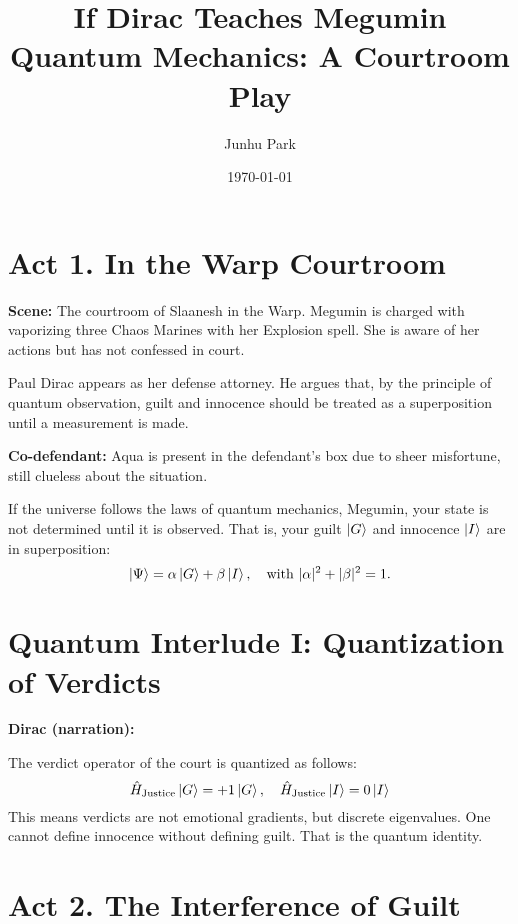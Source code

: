 \documentclass[12pt]{article}
\title{\textbf{If Dirac Teaches Megumin Quantum Mechanics: A Courtroom Play}}
\author{Junhu Park}
\date{\today}
\begin{document}
\maketitle

\section*{Act 1. In the Warp Courtroom}

\textbf{Scene:} The courtroom of Slaanesh in the Warp\cite{SlaaneshWikipedia}.  
Megumin\cite{MeguminWikipedia} is charged with vaporizing three Chaos Marines with her Explosion spell.  
She is aware of her actions but has not confessed in court.

Paul Dirac\cite{DiracWikipedia} appears as her defense attorney.  
He argues that, by the principle of quantum observation\cite{vonNeumann1955}, guilt and innocence should be treated as a superposition until a measurement is made.

\textbf{Co-defendant:}  
Aqua\cite{AquaWikipedia} is present in the defendant's box due to sheer misfortune, still clueless about the situation.

\begin{tcolorbox}[title=Dirac:]
If the universe follows the laws of quantum mechanics\cite{Dirac1930,Griffiths2018}, Megumin, your state is not determined until it is observed. That is, your guilt $\ket{G}$ and innocence $\ket{I}$ are in superposition:
\[
\ket{\Psi} = \alpha \ket{G} + \beta \ket{I}, \quad \text{with } |\alpha|^2 + |\beta|^2 = 1.
\]
\end{tcolorbox}

\section*{Quantum Interlude I: Quantization of Verdicts}

\textbf{Dirac (narration):}

The verdict operator of the court is quantized\cite{NielsenChuang2010} as follows:
\[
\hat{H}_{\text{Justice}} \ket{G} = +1 \ket{G}, \quad \hat{H}_{\text{Justice}} \ket{I} = 0 \ket{I}
\]
This means verdicts are not emotional gradients, but discrete eigenvalues. One cannot define innocence without defining guilt. That is the quantum identity\cite{Dirac1930}.

\section*{Act 2. The Interference of Guilt}
\end{document}

